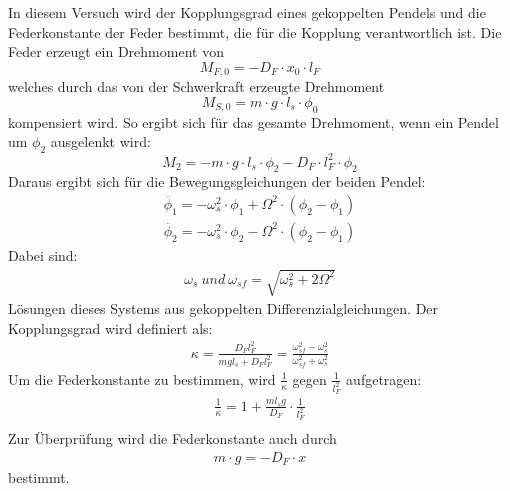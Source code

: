 \documentclass[12pt,a4paper]{article}
\begin{document}
In diesem Versuch wird der Kopplungsgrad eines gekoppelten Pendels und die Federkonstante der Feder bestimmt, die für die Kopplung verantwortlich ist.
Die Feder erzeugt ein Drehmoment von
\begin{equation*}
M_{F,0}=-D_F \cdot x_0 \cdot l_F
\end{equation*}
welches durch das von der Schwerkraft erzeugte Drehmoment 
\begin{equation*}
M_{S,0}=m \cdot g \cdot l_s \cdot \phi_0
\end{equation*}
kompensiert wird.
So ergibt sich für das gesamte Drehmoment, wenn ein Pendel um $\phi_2$ ausgelenkt wird:
\begin{equation*}
M_2=-m \cdot g \cdot l_s \cdot \phi_2 - D_F \cdot l_F^2 \cdot \phi_2
\end{equation*}
Daraus ergibt sich für die Bewegungsgleichungen der beiden Pendel:
\begin{align*}
\ddot{\phi_1}=-\omega_s^2 \cdot \phi_1 + \Omega^2 \cdot (\phi_2 - \phi_1) \\
\ddot{\phi_2}=-\omega_s^2 \cdot \phi_2 - \Omega^2 \cdot (\phi_2 - \phi_1)
\end{align*}
Dabei sind:
\begin{align*}
\omega_s~und~\omega_{sf}=\sqrt{\omega_s^2+2\Omega^2}
\end{align*}
Lösungen dieses Systems aus gekoppelten Differenzialgleichungen.
Der Kopplungsgrad wird definiert als:
\begin{align}
\kappa =\frac{D_F l_F^2}{mgl_s + D_F l_F^2}= \frac{\omega_{sf}^2-\omega_{s}^2}{\omega_{sf}^2+\omega_s^2}
\end{align}
Um die Federkonstante zu bestimmen, wird $\frac{1}{\kappa}$ gegen $\frac{1}{l_F^2}$ aufgetragen:
\begin{align}
\frac{1}{\kappa}=1+\frac{ml_sg}{D_F}\cdot \frac{1}{l_F^2}
\label{k}\\
\end{align}
Zur Überprüfung wird die Federkonstante auch durch
\begin{align}
m \cdot g = -D_F \cdot x
\label{Hook}
\end{align}
bestimmt.
\end{document}
